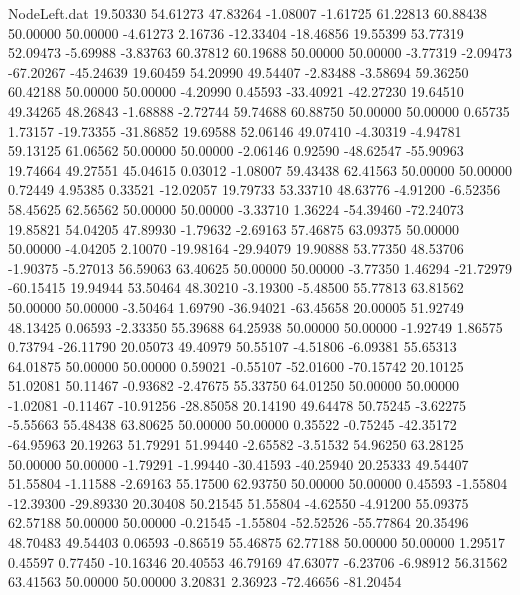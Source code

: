 \begin{filecontents}{NodeLeft.dat}
  19.50330   54.61273   47.83264    -1.08007   -1.61725   61.22813   60.88438   50.00000   50.00000   -4.61273    2.16736  -12.33404  -18.46856
  19.55399   53.77319   52.09473    -5.69988   -3.83763   60.37812   60.19688   50.00000   50.00000   -3.77319   -2.09473  -67.20267  -45.24639
  19.60459   54.20990   49.54407    -2.83488   -3.58694   59.36250   60.42188   50.00000   50.00000   -4.20990    0.45593  -33.40921  -42.27230
  19.64510   49.34265   48.26843    -1.68888   -2.72744   59.74688   60.88750   50.00000   50.00000    0.65735    1.73157  -19.73355  -31.86852
  19.69588   52.06146   49.07410    -4.30319   -4.94781   59.13125   61.06562   50.00000   50.00000   -2.06146    0.92590  -48.62547  -55.90963
  19.74664   49.27551   45.04615     0.03012   -1.08007   59.43438   62.41563   50.00000   50.00000    0.72449    4.95385    0.33521  -12.02057
  19.79733   53.33710   48.63776    -4.91200   -6.52356   58.45625   62.56562   50.00000   50.00000   -3.33710    1.36224  -54.39460  -72.24073
  19.85821   54.04205   47.89930    -1.79632   -2.69163   57.46875   63.09375   50.00000   50.00000   -4.04205    2.10070  -19.98164  -29.94079
  19.90888   53.77350   48.53706    -1.90375   -5.27013   56.59063   63.40625   50.00000   50.00000   -3.77350    1.46294  -21.72979  -60.15415
  19.94944   53.50464   48.30210    -3.19300   -5.48500   55.77813   63.81562   50.00000   50.00000   -3.50464    1.69790  -36.94021  -63.45658
  20.00005   51.92749   48.13425     0.06593   -2.33350   55.39688   64.25938   50.00000   50.00000   -1.92749    1.86575    0.73794  -26.11790
  20.05073   49.40979   50.55107    -4.51806   -6.09381   55.65313   64.01875   50.00000   50.00000    0.59021   -0.55107  -52.01600  -70.15742
  20.10125   51.02081   50.11467    -0.93682   -2.47675   55.33750   64.01250   50.00000   50.00000   -1.02081   -0.11467  -10.91256  -28.85058
  20.14190   49.64478   50.75245    -3.62275   -5.55663   55.48438   63.80625   50.00000   50.00000    0.35522   -0.75245  -42.35172  -64.95963
  20.19263   51.79291   51.99440    -2.65582   -3.51532   54.96250   63.28125   50.00000   50.00000   -1.79291   -1.99440  -30.41593  -40.25940
  20.25333   49.54407   51.55804    -1.11588   -2.69163   55.17500   62.93750   50.00000   50.00000    0.45593   -1.55804  -12.39300  -29.89330
  20.30408   50.21545   51.55804    -4.62550   -4.91200   55.09375   62.57188   50.00000   50.00000   -0.21545   -1.55804  -52.52526  -55.77864
  20.35496   48.70483   49.54403     0.06593   -0.86519   55.46875   62.77188   50.00000   50.00000    1.29517    0.45597    0.77450  -10.16346
  20.40553   46.79169   47.63077    -6.23706   -6.98912   56.31562   63.41563   50.00000   50.00000    3.20831    2.36923  -72.46656  -81.20454

\end{filecontents}
